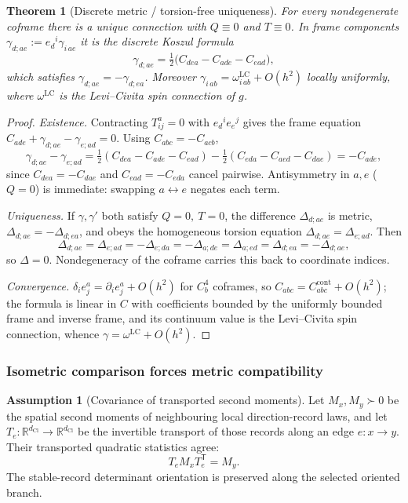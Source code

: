 \documentclass[11pt]{article}
\newtheorem{theorem}{Theorem}[section]
\theoremstyle{definition}
\newtheorem{assumption}{Assumption}[section]
\theoremstyle{remark}
\newcommand{\R}{\mathbb{R}}
\newcommand{\dCl}{d_{\mathrm{Cl}}}
\begin{document}
\begin{theorem}[Discrete metric / torsion-free uniqueness]
\label{thm:fundamental}
For every nondegenerate coframe there is a \emph{unique} connection
with $Q\equiv0$ and $T\equiv0$.  In frame components $\gamma_{d;ae}:=
e_d{}^i\gamma_{i\,ae}$ it is the discrete Koszul formula
\[
  \gamma_{d;ae}=\tfrac12\bigl(C_{dea}-C_{ade}-C_{ead}\bigr),
\]
which satisfies $\gamma_{d;ae}=-\gamma_{d;ea}$.  Moreover $\gamma_{i\,ab}
=\omega^{\mathrm{LC}}_{i\,ab}+O(h^2)$ locally uniformly, where
$\omega^{\mathrm{LC}}$ is the Levi--Civita spin connection of $g$.
\end{theorem}

\begin{proof}
\emph{Existence.}  Contracting $T^a_{ij}=0$ with $e_d{}^ie_e{}^j$ gives the frame
equation $C_{ade}+\gamma_{d;ae}-\gamma_{e;ad}=0$.  Using $C_{abc}=-C_{acb}$,
\[
  \gamma_{d;ae}-\gamma_{e;ad}
  =\tfrac12(C_{dea}-C_{ade}-C_{ead})-\tfrac12(C_{eda}-C_{aed}-C_{dae})
  =-C_{ade},
\]
since $C_{dea}=-C_{dae}$ and $C_{ead}=-C_{eda}$ cancel pairwise.  Antisymmetry in
$a,e$ ($Q=0$) is immediate: swapping $a\leftrightarrow e$ negates each term.

\emph{Uniqueness.}  If $\gamma,\gamma'$ both satisfy $Q=0,\ T=0$, the difference
$\Delta_{d;ae}$ is metric, $\Delta_{d;ae}=-\Delta_{d;ea}$, and obeys the
homogeneous torsion equation $\Delta_{d;ae}=\Delta_{e;ad}$.  Then
\[
  \Delta_{d;ae}=\Delta_{e;ad}=-\Delta_{e;da}=-\Delta_{a;de}
  =\Delta_{a;ed}=\Delta_{d;ea}=-\Delta_{d;ae},
\]
so $\Delta=0$.  Nondegeneracy of the coframe carries this back to coordinate
indices.

\emph{Convergence.}  $\delta_i e^a_j=\partial_i e^a_j+O(h^2)$ for $C^4_b$
coframes, so $C_{abc}=C^{\mathrm{cont}}_{abc}+O(h^2)$; the formula is linear in
$C$ with coefficients bounded by the uniformly bounded frame and inverse frame,
and its continuum value is the Levi--Civita spin connection, whence
$\gamma=\omega^{\mathrm{LC}}+O(h^2)$.
\end{proof}
\subsubsection{Isometric comparison forces metric compatibility}

\begin{assumption}[Covariance of transported second moments]
\label{ass:second-moment-covariance}
Let \(M_x,M_y\succ0\) be the spatial second moments of neighbouring local
direction-record laws, and let
\(T_e:\R^{\dCl}\to\R^{\dCl}\) be the invertible transport of those records along
an edge \(e:x\to y\).  Their transported quadratic statistics agree:
\[
   T_e M_x T_e^{\mathsf T}=M_y.
\]
The stable-record determinant orientation is preserved along the selected
oriented branch.
\end{assumption}
\end{document}
